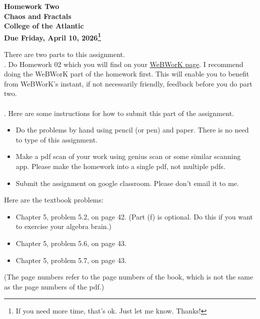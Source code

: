 \documentclass[14pt]{extarticle}
\begin{document}
\pagestyle{empty}
 
\begin{center}
{\LARGE {\bf Homework Two}}\\
\bigskip
{\Large {\bf Chaos and Fractals}}\\
\bigskip
{\Large {\bf College of the Atlantic}}\\
\bigskip
{ {\bf Due Friday, April 10, 2026\footnote{If you need more time,
      that's ok. Just let me know. Thanks!}}}\\  
\end{center}
\medskip


\noindent There are two parts to this assignment.\\

.  Do Homework 02 which you will find
on your
\href{https://webwork-hosting.runestone.academy/webwork2/coa-feldman-es1026i-spring2026}{WeBWorK 
  page}. I recommend doing the WeBWorK part of the 
homework first.  This will enable you to benefit from WeBWorK's
instant, if not necessarily friendly, feedback before you do part two.\\

\hspace{2mm}\\

.  Here are some
instructions for how to submit this part of the assignment.
\begin{itemize}
\item Do the problems by hand using pencil (or pen) and paper.
  There is no need to type of this assignment.
\item Make a pdf scan of your work using genius scan or some
  similar scanning app. Please make the homework into a single
  pdf, not multiple pdfs.
\item Submit the assignment on google classroom.  Please don't
  email it to me. 
\end{itemize}

\noindent Here are the textbook problems:

\begin{itemize}
\setlength{\itemsep}{-1mm}
  \item Chapter 5, problem 5.2, on page 42. (Part (f) is optional. Do
    this if you want to exercise your algebra brain.) 
  \item Chapter 5, problem 5.6, on page 43.
  \item Chapter 5, problem 5.7, on page 43.
\end{itemize}

(The page numbers refer to the page numbers of the book, which is not
the same as the page numbers of the pdf.)

\end{document}
